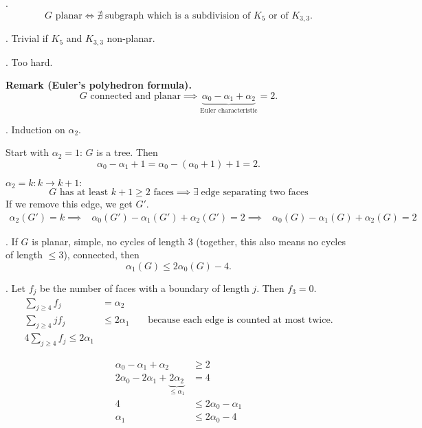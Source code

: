 \Theorem.
\[
    G\text{ planar} \iff \nexists\;\text{subgraph which is a subdivision of $K_5$ or of $K_{3,3}$.}
\]

\ProofBackward. Trivial if $K_5$ and $K_{3,3}$ non-planar.

\ProofForward. Too hard.

\textbf{Remark (Euler's polyhedron formula).}
\[
    G\text{ connected and planar} \implies
    \underbrace{\alpha_0 - \alpha_1 + \alpha_2}_
        {\text{Euler characteristic}}
    = 2.
\]



\Proof.
Induction on $\alpha_2$.

Start with $\alpha_2=1$: $G$ is a tree. Then
\[
    \alpha_0-\alpha_1+1 = \alpha_0 - (\alpha_0 + 1) + 1 = 2.
\]

$\alpha_2 = k : k\rightarrow k+1: $
\[
    \text{$G$ has at least $k+1 \geq 2$ faces} \implies
    \exists\;\text{edge separating two faces}
\]
If we remove this edge, we get $G'$.
\begin{align*}
    \alpha_2(G') = k
    \implies &\alpha_0(G') - \alpha_1(G') + \alpha_2(G') = 2
    \implies &\alpha_0(G) - \alpha_1(G) + \alpha_2(G) = 2
\end{align*}

\Lemma.
If $G$ is planar, simple, no cycles of length $3$ (together, this also means no cycles of length $≤ 3$), connected, then
\[
    \alpha_1(G) ≤ 2\alpha_0(G) - 4.
\]

\Proof.
Let $f_j$ be the number of faces with a boundary of length $j$.
Then $f_3 = 0$.
\begin{align*}
\sum_{j≥4} f_j &= \alpha_2 \\
\sum_{j≥4} j f_j &≤ 2\alpha_1
    &&\text{ because each edge is counted at most twice.} \\
4 \sum_{j≥4} f_j ≤ 2\alpha_1
\end{align*}


\begin{align*}
    \alpha_0 - \alpha_1 + \alpha_2 &≥ 2 \\
    2\alpha_0 - 2\alpha_1 +
    \underbrace{2\alpha_2}_{≤ \alpha_1} &= 4 \\
    4 &≤ 2\alpha_0 - \alpha_1 \\
    \alpha_1 &≤ 2\alpha_0 - 4
\end{align*}

